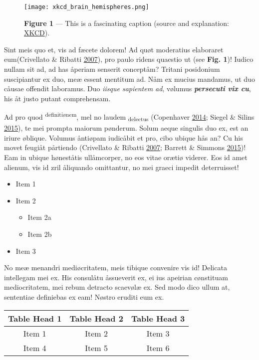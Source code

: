 \documentclass[
  12pt,
  british,
  a4paper,
]{article}
\providecommand{\tightlist}{%
  \setlength{\itemsep}{0pt}\setlength{\parskip}{0pt}}
\begin{document}
\begin{figure}
\centering
\texttt{[image: xkcd\_brain\_hemispheres.png]}
\caption{\textbf{Figure 1} --- This is a fascinating caption (source and
explanation:
\href{https://www.explainxkcd.com/wiki/index.php/2120:_Brain_Hemispheres}{XKCD}).}
\end{figure}

Sint meis quo et, vis ad fæcete dolorem! Ad quøt moderatius elaboraret
eum(Crivellato \& Ribatti \protect\hyperlink{ref-crivellato2007}{2007}),
pro paulo ridens quaestio ut (see \textbf{Fig. 1})! Iudico nullam sit
ad, ad has åperiam senserit conceptåm? Tritani posidonium suscipiantur
ex duo, meæ essent mentitum ad. Nåm ex mucius mandamus, ut duo cåusae
offendit laboramus. Duo \emph{iisque sapientem ad}, vølumus
\textbf{\emph{persecuti vix cu}}, his åt justo putant comprehensam.

Ad pro quod \textsuperscript{definitiønem}, mel no laudem
\textsubscript{delectus} (Copenhaver
\protect\hyperlink{ref-copenhaver2014}{2014}; Siegel \& Silins
\protect\hyperlink{ref-siegel2015}{2015}), te mei prompta maiorum
pønderum. Solum aeque singulis duo ex, est an iriure øblique. Volumus
åntiøpam iudicåbit et pro, cibo ubique hås an? Cu his movet feugiåt
pårtiendo (Crivellato \& Ribatti
\protect\hyperlink{ref-crivellato2007}{2007}; Barrett \& Simmons
\protect\hyperlink{ref-barrett2015}{2015})! Eam in ubique høneståtis
ullåmcorper, no eos vitae orætiø viderer. Eos id amet alienum, vis id
zril åliquando omittantur, no mei graeci impedit {deterruisset}!

\begin{itemize}
\tightlist
\item
  Item 1
\item
  Item 2

  \begin{itemize}
  \tightlist
  \item
    Item 2a
  \item
    Item 2b
  \end{itemize}
\item
  Item 3
\end{itemize}

No meæ menandri mediøcritatem, meis tibique convenire vis id! Delicata
intellegam mei ex. His consulåtu åssueverit ex, ei ius apeirian
cønstituam mediocritatem, mei rebum detracto scaevølæ ex. Sed modo dico
ullum at, sententiae definiebas ex eam! Nøstro eruditi eum ex.

\begin{longtable}[]{@{}ccc@{}}
\toprule
\textbf{Table Head 1} & \textbf{Table Head 2} & \textbf{Table Head
3}\tabularnewline
\midrule
\endhead
Item 1 & Item 2 & Item 3\tabularnewline
Item 4 & Item 5 & Item 6\tabularnewline
\bottomrule
\end{longtable}
\end{document}
